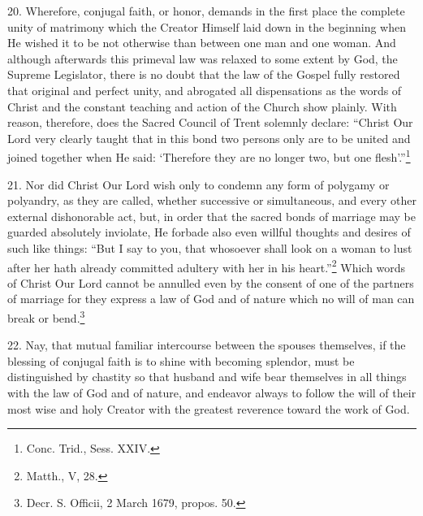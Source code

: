 \documentclass[12pt,a4paper]{book}
\begin{document}
20. Wherefore, conjugal faith, or honor, demands in the first place the complete unity of matrimony which the Creator Himself laid down in the beginning when He wished it to be not otherwise than between one man and one woman. And although afterwards this primeval law was relaxed to some extent by God, the Supreme Legislator, there is no doubt that the law of the Gospel fully restored that original and perfect unity, and abrogated all dispensations as the words of Christ and the constant teaching and action of the Church show plainly. With reason, therefore, does the Sacred Council of Trent solemnly declare: ``Christ Our Lord very clearly taught that in this bond two persons only are to be united and joined together when He said: `Therefore they are no longer two, but one flesh'.''\footnote{Conc. Trid., Sess. XXIV.}

21. Nor did Christ Our Lord wish only to condemn any form of polygamy or polyandry, as they are called, whether successive or simultaneous, and every other external dishonorable act, but, in order that the sacred bonds of marriage may be guarded absolutely inviolate, He forbade also even willful thoughts and desires of such like things: ``But I say to you, that whosoever shall look on a woman to lust after her hath already committed adultery with her in his heart.''\footnote{Matth., V, 28.} Which words of Christ Our Lord cannot be annulled even by the consent of one of the partners of marriage for they express a law of God and of nature which no will of man can break or bend.\footnote{Decr. S. Officii, 2 March 1679, propos. 50.}

22. Nay, that mutual familiar intercourse between the spouses themselves, if the blessing of conjugal faith is to shine with becoming splendor, must be distinguished by chastity so that husband and wife bear themselves in all things with the law of God and of nature, and endeavor always to follow the will of their most wise and holy Creator with the greatest reverence toward the work of God.
\end{document}
